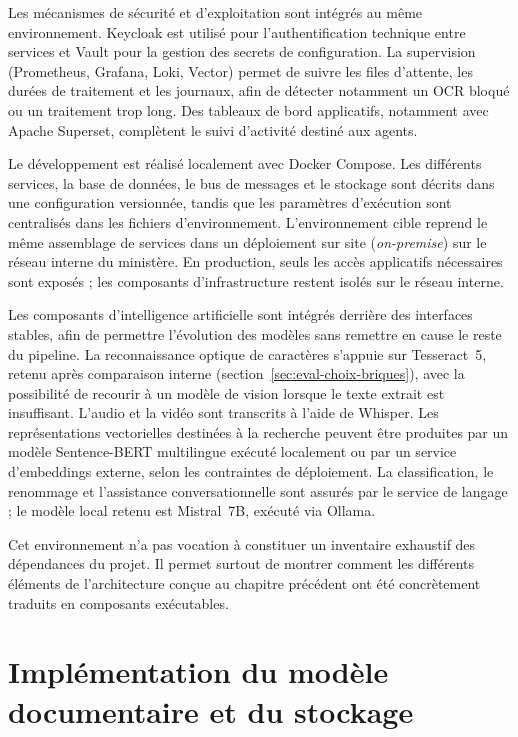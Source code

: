 Les mécanismes de sécurité et d'exploitation sont intégrés au même environnement. Keycloak est utilisé pour l'authentification technique entre services et Vault pour la gestion des secrets de configuration. La supervision (Prometheus, Grafana, Loki, Vector) permet de suivre les files d'attente, les durées de traitement et les journaux, afin de détecter notamment un OCR bloqué ou un traitement trop long. Des tableaux de bord applicatifs, notamment avec Apache Superset, complètent le suivi d'activité destiné aux agents.

Le développement est réalisé localement avec Docker Compose. Les différents services, la base de données, le bus de messages et le stockage sont décrits dans une configuration versionnée, tandis que les paramètres d'exécution sont centralisés dans les fichiers d'environnement. L'environnement cible reprend le même assemblage de services dans un déploiement sur site (\textit{on-premise}) sur le réseau interne du ministère. En production, seuls les accès applicatifs nécessaires sont exposés ; les composants d'infrastructure restent isolés sur le réseau interne.

Les composants d'intelligence artificielle sont intégrés derrière des interfaces stables, afin de permettre l'évolution des modèles sans remettre en cause le reste du pipeline. La reconnaissance optique de caractères s'appuie sur Tesseract~5, retenu après comparaison interne (section~\ref{sec:eval-choix-briques}), avec la possibilité de recourir à un modèle de vision lorsque le texte extrait est insuffisant. L'audio et la vidéo sont transcrits à l'aide de Whisper. Les représentations vectorielles destinées à la recherche peuvent être produites par un modèle Sentence-BERT multilingue exécuté localement ou par un service d'embeddings externe, selon les contraintes de déploiement. La classification, le renommage et l'assistance conversationnelle sont assurés par le service de langage ; le modèle local retenu est Mistral~7B, exécuté via Ollama.

Cet environnement n'a pas vocation à constituer un inventaire exhaustif des dépendances du projet. Il permet surtout de montrer comment les différents éléments de l'architecture conçue au chapitre précédent ont été concrètement traduits en composants exécutables.

\section{Implémentation du modèle documentaire et du stockage}

